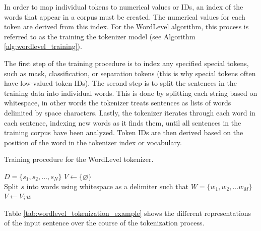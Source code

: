 \documentclass[12pt]{article}
\begin{document}
In order to map individual tokens to numerical values or IDs, an index of the words that appear in a corpus must be created. The numerical values for
each token are derived from this index. For the WordLevel algorithm, this process is referred to as the training the tokenizer model (see Algorithm
\ref{alg:wordlevel_training}).

The first step of the training procedure is to index any specified special tokens, such as mask, classification, or separation tokens (this is why
special tokens often have low-valued token IDs). The second step is to split the sentences in the training data into individual words. This is done
by splitting each string based on whitespace, in other words the tokenizer treats sentences as lists of words delimited by space characters. Lastly,
the tokenizer iterates through each word in each sentence, indexing new words as it finds them, until all sentences in the training corpus have been
analyzed. Token IDs are then derived based on the position of the word in the tokenizer index or vocabulary.

\begin{algorithm}[!t]
    \caption{Training procedure for the WordLevel tokenizer.}
    \label{alg:wordlevel_training}
    \begin{algorithmic}
        \State $D = \{s_1, s_2, ..., s_N\}$
        \State $V \gets \{\varnothing\}$
        \\

        \State Split $s$ into words using whitespace as a delimiter such that
        \State $W=\{w_1, w_2, ... w_M\}$
        \\

        \State $V \gets V;w$
        \EndIf
        \EndFor
        \EndFor
    \end{algorithmic}
\end{algorithm}

Table \ref{tab:wordlevel_tokenization_example} shows the different representations of the input sentence over the course of the tokenization process.
\end{document}
